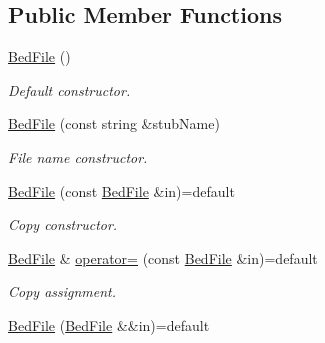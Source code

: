 \subsection*{Public Member Functions}
\begin{DoxyCompactItemize}
\item 
\mbox{\label{classvarfiles_1_1_bed_file_a0853371d06c87876859d5cf3c711c8e3}} 
\hyperlink{classvarfiles_1_1_bed_file_a0853371d06c87876859d5cf3c711c8e3}{Bed\+File} ()
\begin{DoxyCompactList}\small\item\em Default constructor. \end{DoxyCompactList}\item 
\hyperlink{classvarfiles_1_1_bed_file_a69631d96080c22e686e8acb75cf2cc89}{Bed\+File} (const string \&stub\+Name)
\begin{DoxyCompactList}\small\item\em File name constructor. \end{DoxyCompactList}\item 
\mbox{\label{classvarfiles_1_1_bed_file_a8d8df3d81d30bfa05993063067672bb6}} 
\hyperlink{classvarfiles_1_1_bed_file_a8d8df3d81d30bfa05993063067672bb6}{Bed\+File} (const \hyperlink{classvarfiles_1_1_bed_file}{Bed\+File} \&in)=default
\begin{DoxyCompactList}\small\item\em Copy constructor. \end{DoxyCompactList}\item 
\mbox{\label{classvarfiles_1_1_bed_file_ada51133e368986219e8ca65087dd6eed}} 
\hyperlink{classvarfiles_1_1_bed_file}{Bed\+File} \& \hyperlink{classvarfiles_1_1_bed_file_ada51133e368986219e8ca65087dd6eed}{operator=} (const \hyperlink{classvarfiles_1_1_bed_file}{Bed\+File} \&in)=default
\begin{DoxyCompactList}\small\item\em Copy assignment. \end{DoxyCompactList}\item 
\mbox{\label{classvarfiles_1_1_bed_file_a529807ccc868221446908cdff56dc2c8}} 
\hyperlink{classvarfiles_1_1_bed_file_a529807ccc868221446908cdff56dc2c8}{Bed\+File} (\hyperlink{classvarfiles_1_1_bed_file}{Bed\+File} \&\&in)=default

\end{DoxyCompactItemize}
